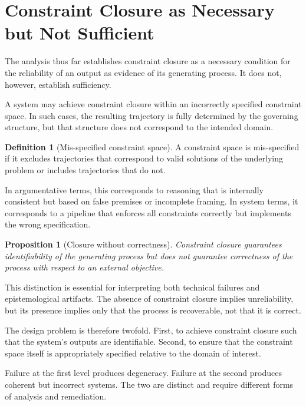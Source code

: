 \documentclass[12pt, oneside]{article}
\theoremstyle{plain}
\newtheorem{proposition}[theorem]{Proposition}
\theoremstyle{definition}
\newtheorem{definition}[theorem]{Definition}
\theoremstyle{remark}
\begin{document}
\section{Constraint Closure as Necessary but Not Sufficient}

The analysis thus far establishes constraint closure as a necessary condition for
the reliability of an output as evidence of its generating process. It does not,
however, establish sufficiency.

A system may achieve constraint closure within an incorrectly specified constraint
space. In such cases, the resulting trajectory is fully determined by the governing
structure, but that structure does not correspond to the intended domain.

\begin{definition}[Mis-specified constraint space]
A constraint space is mis-specified if it excludes trajectories that correspond
to valid solutions of the underlying problem or includes trajectories that do not.
\end{definition}

In argumentative terms, this corresponds to reasoning that is internally consistent
but based on false premises or incomplete framing. In system terms, it corresponds
to a pipeline that enforces all constraints correctly but implements the wrong
specification.

\begin{proposition}[Closure without correctness]
Constraint closure guarantees identifiability of the generating process but does
not guarantee correctness of the process with respect to an external objective.
\end{proposition}

This distinction is essential for interpreting both technical failures and
epistemological artifacts. The absence of constraint closure implies unreliability,
but its presence implies only that the process is recoverable, not that it is
correct.

The design problem is therefore twofold. First, to achieve constraint closure such
that the system's outputs are identifiable. Second, to ensure that the constraint
space itself is appropriately specified relative to the domain of interest.

Failure at the first level produces degeneracy. Failure at the second produces
coherent but incorrect systems. The two are distinct and require different forms
of analysis and remediation.
\end{document}
